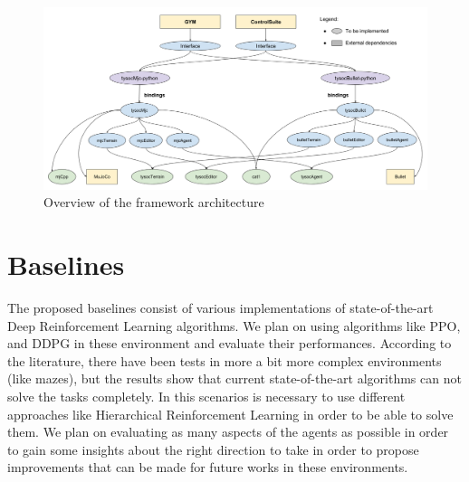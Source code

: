 \begin{figure}
    \centering
    \includegraphics[width=8in]{./chapters/imgs/img_proposal_part1_framework.png}
    \caption[img_proposal_part1_framework]{Overview of the framework architecture}
    \label{fig:img_proposal_part1_framework}
\end{figure}

\section{Baselines}

The proposed baselines consist of various implementations of state-of-the-art Deep Reinforcement Learning
algorithms. We plan on using algorithms like PPO, and DDPG in these environment and evaluate their performances.
According to the literature, there have been tests in more a bit more complex environments (like mazes), but
the results show that current state-of-the-art algorithms can not solve the tasks completely. In this scenarios
is necessary to use different approaches like Hierarchical Reinforcement Learning in order to be able to solve them.
We plan on evaluating as many aspects of the agents as possible in order to gain some insights about the right
direction to take in order to propose improvements that can be made for future works in these environments.